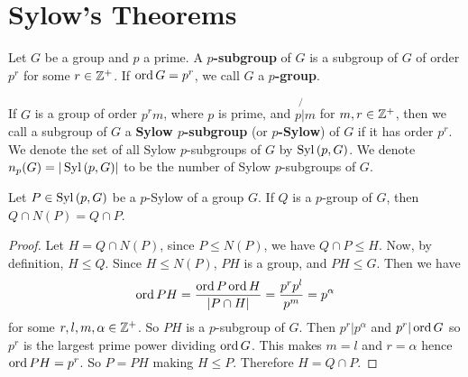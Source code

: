 \section{Sylow's Theorems}

\begin{definition}
    Let $G$ be a group and $p$ a prime. A  \textbf{$p$-subgroup} of $G$ is a
    subgroup of $G$ of order  $p^r$ for some $r \in \mathbb{Z}^+$. If $\operatorname{ord}{G}=p^r$, we
    call  $G$ a  \textbf{$p$-group}.
\end{definition}

\begin{definition}
    If $G$ is a group of order  $p^rm$, where  $p$ is prime, and  $p \not{|} m$
    for  $m,r \in \mathbb{Z}^+$, then we call a subgroup of $G$ a \textbf{Sylow
    $p$-subgroup} (or \textbf{$p$-Sylow}) of $G$ if it has order $p^r$. We
    denote the set of all Sylow $p$-subgroups of $G$ by  $\operatorname{Syl}{(p,G)}$. We
    denote $n_p(G)=|\operatorname{Syl}{(p,G)}|$ to be the number of Sylow $p$-subgroups of
    $G$.
\end{definition}

\begin{lemma}\label{4.5.1}
    Let $P \in \operatorname{Syl}{(p,G)}$ be a $p$-Sylow of a group  $G$. If  $Q$ is a
    $p$-group of  $G$, then  $Q \cap N(P)=Q \cap P$.
\end{lemma}
\begin{proof}
    Let $H=Q \cap N(P)$, since $P \leq N(P)$, we have $Q \cap P \leq H$. Now, by
    definition, $H \leq Q$. Since $H \leq N(P)$, $PH$ is a group, and  $PH \leq
    G$. Then we have
    \begin{equation*}
        \operatorname{ord}{PH}=\frac{\operatorname{ord}{P}\operatorname{ord}{H}}{|P \cap H|}=\frac{p^rp^l}{p^m}=p^\alpha
    \end{equation*}
    for some $r,l,m,\alpha \in \mathbb{Z}^+$. So $PH$ is a  $p$-subgroup of  $G$. Then
    $p^r|p^\alpha$ and  $p^r|\operatorname{ord}{G}$ so $p^r$ is the largest prime power
    dividing  $\operatorname{ord}{G}$. This makes $m=l$ and $r=\alpha$ hence $\operatorname{ord}{PH}=p^r$.
    So $P=PH$ making $H \leq P$. Therefore $H=Q \cap P$.
\end{proof}

